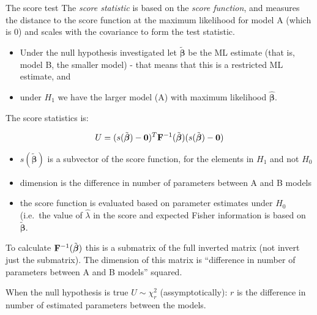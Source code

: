\documentclass[
  ignorenonframetext,
]{beamer}
\providecommand{\tightlist}{%
  \setlength{\itemsep}{0pt}\setlength{\parskip}{0pt}}
\begin{document}
\begin{frame}
\begin{block}{The score test}
\label{the-score-test}
The \emph{score statistic} is based on the \emph{score function}, and
measures the distance to the score function at the maximum likelihood
for model A (which is 0) and scales with the covariance to form the test
statistic.

\begin{itemize}
\tightlist
\item
  Under the null hypothesis investigated let
  \(\tilde{\boldsymbol{\beta}}\) be the ML estimate (that is, model B,
  the smaller model) - that means that this is a restricted ML estimate,
  and
\item
  under \(H_1\) we have the larger model (A) with maximum likelihood
  \(\hat{\boldsymbol{\beta}}\).
\end{itemize}
\end{block}
\end{frame}

\begin{frame}
The score statistics is:

\[ U=(s(\tilde{\boldsymbol{\beta}})-{\bf 0})^T{\bf F}^{-1}(\tilde{\boldsymbol{\beta}})(s(\tilde{\boldsymbol{\beta}})-{\bf 0})\]

\begin{itemize}
\tightlist
\item
  \(s(\tilde{\boldsymbol{\beta}})\) is a subvector of the score
  function, for the elements in \(H_1\) and not \(H_0\)
\item
  dimension is the difference in number of parameters between A and B
  models
\item
  the score function is evaluated based on parameter estimates under
  \(H_0\) (i.e.~the value of \(\hat{\lambda}\) in the score and expected
  Fisher information is based on \(\tilde{\boldsymbol{\beta}}\).
\end{itemize}
\end{frame}

\begin{frame}
To calculate \({\bf F}^{-1}(\tilde{\boldsymbol{\beta}})\) this is a
submatrix of the full inverted matrix (not invert just the submatrix).
The dimension of this matrix is ``difference in number of parameters
between A and B models'' squared.

When the null hypothesis is true \(U \sim \chi^2_r\) (assymptotically):
\(r\) is the difference in number of estimated parameters between the
models.
\end{frame}
\end{document}
